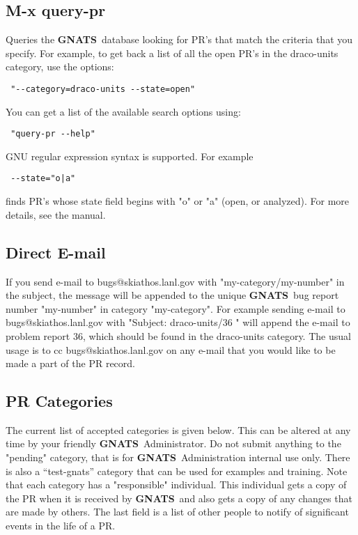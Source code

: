 \documentclass[11pt]{nmemo}
\newcommand{\gnats}{{\normalfont\bfseries GNATS}}
\begin{document}
\subsection{M-x query-pr }
Queries the \gnats\ database looking for PR's that match the criteria
that you specify. For example, to get back a list of all the open PR's
in the draco-units category, use the options:
\begin{verbatim} "--category=draco-units --state=open" \end{verbatim}
 You can get a list of the available search options using: 
\begin{verbatim} "query-pr --help" \end{verbatim}
GNU regular expression syntax is supported.
For example \begin{verbatim} --state="o|a" \end{verbatim}
finds PR's whose state field begins
with "o" or "a" (open, or analyzed). For more details, see the manual.

\subsection{Direct E-mail }
If you send e-mail to bugs@skiathos.lanl.gov with
"my-category/my-number" in the subject, the message will be appended to
the unique \gnats\ bug report number "my-number" in category "my-category".
For example sending e-mail to
bugs@skiathos.lanl.gov with "Subject: draco-units/36 " will
append the e-mail to problem report 36, which should be found in the 
draco-units category.
The usual usage is to cc bugs@skiathos.lanl.gov on any e-mail that
you would like to be made a part of the PR record.

\subsection {PR Categories}
The current list of accepted categories is given below. This can be altered 
at any time by your friendly \gnats\ Administrator.
Do not submit anything to the "pending" category, that is for
\gnats\ Administration internal use only. There is also a ``test-gnats''
category that can be used for examples and training.
Note that each category has a "responsible" individual.  This
individual gets a copy of the PR when it is received by \gnats\, and also
gets a copy of any changes that are made by others. The last field is
a list of other people to notify of significant events in the life
of a PR.
\end{document}
